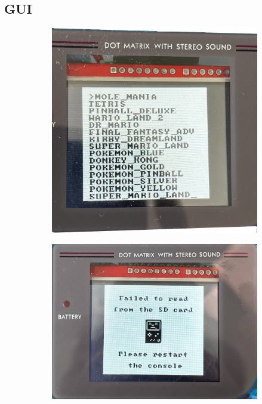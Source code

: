 \documentclass[hidelinks,12pt]{article}
\begin{document}
\subsection{GUI}
\begin{figure}[h]
	\begin{center}
		\begin{subfigure}[b]{0.4\textwidth}
			\begin{center}
				\includegraphics[scale=0.65]{figures/game_choice_gui.png}
			\end{center}
			\caption{}
			\label{fig:gui_choice}
		\end{subfigure}
		\hfill
		\begin{subfigure}[b]{0.4\textwidth}
			\begin{center}
				\includegraphics[scale=0.2]{figures/error_gui.png}
			\end{center}
			\caption{}
			\label{fig:gui_err}
		\end{subfigure}
	\end{center}
	\caption{}
\end{figure}
\end{document}
